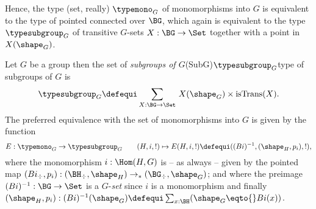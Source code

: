 Hence, the type (set, really) $\typemono_G$ of monomorphisms into $G$ is equivalent to the type of pointed connected \coverings over $\BG$, which again is equivalent to the type $\typesubgroup_G$ of transitive $G$-sets $X:\BG\to\Set$ together with a point in $X(\shape_G)$.

\begin{definition}
  Let $G$ be a group then the set of \emph{subgroups of $G$}\glossary(SubG){$\protect{\typesubgroup_G}$}{type of subgroups of $G$} is
  $$\typesubgroup_G\defequi\sum_{X:\BG\to\Set}{\,}X(\shape_G)\times\mathrm{isTrans}(X).$$
  The preferred equivalence
  with the set of monomorphisms into $G$ is given by the function
 $$E:\typemono_G\to\typesubgroup_G\qquad (H,i,!)\mapsto E(H,i,!)\defequi ((Bi)^{-1},(\shape_H,p_i),!),$$
  where the monomorphism $i:\Hom(H,G)$ is -- as always -- given by the pointed map $(Bi_\div,p_i):(\BH_\div,\shape_H)\to_*(\BG_\div,\shape_G)$; and where the preimage $(Bi)^{-1}:\BG\to\Set$ is a $G$-\emph{set} since $i$ is a monomorphism  and finally $(\shape_H,p_i):(Bi)^{-1}(\shape_G)\defequi \sum_{x:\BH}(\shape_G\eqto{}Bi(x))$.
\end{definition}

